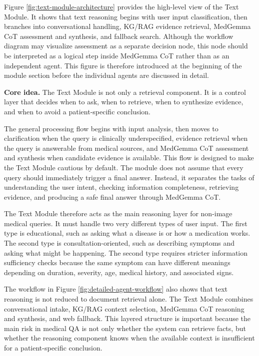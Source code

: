 Figure \ref{fig:text-module-architecture} provides the high-level view of the Text Module. It shows that text reasoning begins with user input classification, then branches into conversational handling, KG/RAG evidence retrieval, MedGemma CoT assessment and synthesis, and fallback search. Although the workflow diagram may visualize assessment as a separate decision node, this node should be interpreted as a logical step inside MedGemma CoT rather than as an independent agent. This figure is therefore introduced at the beginning of the module section before the individual agents are discussed in detail.

\textbf{Core idea.} The Text Module is not only a retrieval component. It is a control layer that decides when to ask, when to retrieve, when to synthesize evidence, and when to avoid a patient-specific conclusion.

The general processing flow begins with input analysis, then moves to clarification when the query is clinically underspecified, evidence retrieval when the query is answerable from medical sources, and MedGemma CoT assessment and synthesis when candidate evidence is available. This flow is designed to make the Text Module cautious by default. The module does not assume that every query should immediately trigger a final answer. Instead, it separates the tasks of understanding the user intent, checking information completeness, retrieving evidence, and producing a safe final answer through MedGemma CoT.

The Text Module therefore acts as the main reasoning layer for non-image medical queries. It must handle two very different types of user input. The first type is educational, such as asking what a disease is or how a medication works. The second type is consultation-oriented, such as describing symptoms and asking what might be happening. The second type requires stricter information sufficiency checks because the same symptom can have different meanings depending on duration, severity, age, medical history, and associated signs.

The workflow in Figure \ref{fig:detailed-agent-workflow} also shows that text reasoning is not reduced to document retrieval alone. The Text Module combines conversational intake, KG/RAG context selection, MedGemma CoT reasoning and synthesis, and web fallback. This layered structure is important because the main risk in medical QA is not only whether the system can retrieve facts, but whether the reasoning component knows when the available context is insufficient for a patient-specific conclusion.


